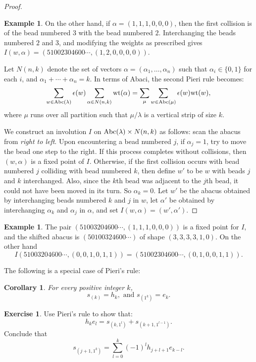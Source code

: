 \documentclass[11pt]{amsproc}
\newtheorem{corollary}[theorem]{Corollary}
\theoremstyle{definition}
\theoremstyle{example}
\newtheorem{example}[theorem]{Example}
\newtheorem{exercise}[theorem]{Exercise}
\newcommand{\wt}{\textup{wt}}
\newcommand{\abc}{\textup{Abc}}
\begin{document}
\begin{proof}
\begin{example}
    On the other hand, if $\alpha=(1, 1, 1, 0, 0, 0)$, then the first collision is of the bead numbered $3$ with the bead numbered $2$.
    Interchanging the beads numbered $2$ and $3$, and modifying the weights as prescribed gives $I(w,\alpha) = (51002304600\dotsb, (1,2,0,0,0,0))$.
  \end{example}

  Let $N(n,k)$ denote the set of vectors $\alpha=(\alpha_1,\dotsc,\alpha_n)$ such that $\alpha_i\in \{0,1\}$ for each $i$, and $\alpha_1+\dotsb+\alpha_n=k$.
  In terms of Abaci, the second Pieri rule becomes:
  \begin{displaymath}
    \sum_{w\in \abc(\lambda)} \epsilon(w)\sum_{\alpha\in N(n,k)} \wt(\alpha) = \sum_\mu \sum_{w\in \abc(\mu)} \epsilon(w) \wt(w),
  \end{displaymath}
  where $\mu$ runs over all partition such that $\mu/\lambda$ is a vertical strip of size $k$.
  
  We construct an involution $I$ on $\abc(\lambda)\times N(n,k)$ as follows: scan the abacus from \emph{right to left}.
  Upon encountering a bead numbered $j$, if $\alpha_j=1$, try to move the bead one step to the right.
  If this process completes without collisions, then $(w,\alpha)$ is a fixed point of $I$.
  Otherwise, if the first collision occurs with bead numbered $j$ colliding with bead numbered $k$, then define $w'$ to be $w$ with beads $j$ and $k$ interchanged.
  Also, since the $k$th bead was adjacent to the $j$th bead, it could not have been moved in its turn.
  So $\alpha_k=0$.
  Let $w'$ be the abacus obtained by interchanging beads numbered $k$ and $j$ in $w$, 
  let $\alpha'$ be obtained by interchanging $\alpha_k$ and $\alpha_j$ in $\alpha$, and set $I(w,\alpha)=(w',\alpha')$.
\end{proof}
  \begin{example}
  The pair $(51003204600\dotsb,(1,1,1,0,0,0))$ is a fixed point for $I$, and the shifted abacus is $(50100324600\dotsb)$ of shape $(3,3,3,3,1,0)$.
  On the other hand 
  \begin{displaymath}
    I(51003204600\dotsb,(0,0,1,0,1,1))=(51002304600\dotsb, (0,1,0,0,1,1)).
  \end{displaymath}
\end{example}
The following is a special case of Pieri's rule:
\begin{corollary}
  For every positive integer $k$,
  \begin{displaymath}
    s_{(k)} = h_k, \text{ and } s_{(1^k)} = e_k.
  \end{displaymath}
\end{corollary}
\begin{exercise}
  \label{exercise:hook-schur}
  Use Pieri's rule to show that:
  \begin{displaymath}
    h_ke_l = s_{(k, 1^l)} + s_{(k+1, 1^{l-1})}.
  \end{displaymath}
  Conclude that
  \begin{displaymath}
    s_{(j+1,1^k)} = \sum_{l=0}^k (-1)^l h_{j+l+1}e_{k-l}.
  \end{displaymath}
\end{exercise}
\end{document}

